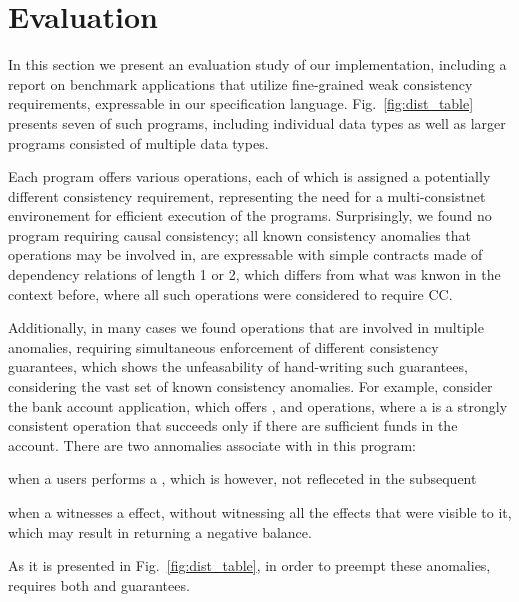 \newpage
\section{Evaluation}
\label{sec:eval}
%

In this section we present an evaluation study of our implementation,
including a report on
benchmark applications that utilize fine-grained weak consistency
requirements, expressable
in our specification language.
Fig.~\ref{fig:dist_table} presents seven of such programs, including
individual data types as well as larger programs consisted of multiple
data types. 

Each program offers various operations, each of which is assigned a
potentially different consistency requirement,
representing the need for a multi-consistnet environement for
efficient execution of the programs. Surprisingly, we found no program
requiring causal consistency; all known consistency anomalies that operations
may be involved in, are expressable with simple contracts made of
dependency relations of length 1 or 2,
which differs from what was knwon in the context before, where all such
operations were considered to require CC.

Additionally, in many cases we found operations that are involved in
multiple anomalies, requiring simultaneous enforcement of different
consistency guarantees, which shows the unfeasability of hand-writing
such guarantees, considering the vast set  of known consistency
anomalies. 
%
For example, consider the bank account application, which offers
\dRV{}, \wdRV{} and \gbRV{} operations, where a \wdRV{} is a
strongly consistent operation that succeeds only if there are sufficient
funds in the account. There are two annomalies associate with
\gbRV{} in this program:
\begin{enumerate*}[label=(\roman*)]
\item when a users performs a \dRV{}, which is however, not refleceted
in the subsequent \gbRV{}
\item when a \gbRV{} witnesses a \wdRV{} effect, without witnessing all
the \dRV{} effects that were visible to it,
which may result in \gbRV{} returning a
negative balance.
\end{enumerate*}
As it is presented in Fig.~\ref{fig:dist_table}, in order to preempt
these anomalies, \gbRV{} requires
both \rmwCTRT{} and \visCTRT{} guarantees.


